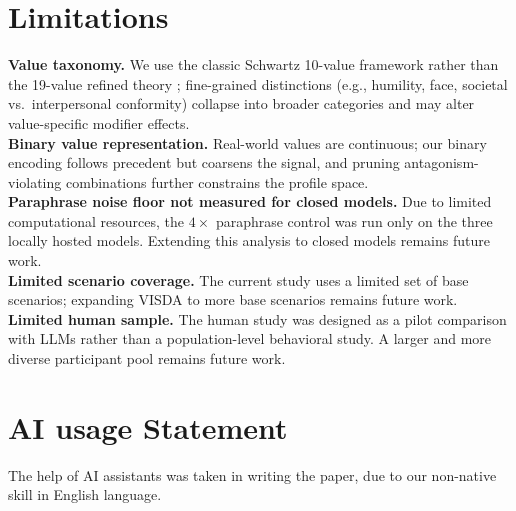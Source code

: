\documentclass[11pt]{article}
\begin{document}
\section*{Limitations}
\label{sec:limitations}
\textbf{Value taxonomy.} We use the classic Schwartz 10-value framework rather than the 19-value refined theory \citep{schwartz2012refined}; fine-grained distinctions (e.g., humility, face, societal vs.\ interpersonal conformity) collapse into broader categories and may alter value-specific modifier effects.\\[2pt]
\textbf{Binary value representation.} Real-world values are continuous; our binary encoding follows precedent \citep{sorensen2024value} but coarsens the signal, and pruning antagonism-violating combinations further constrains the profile space.\\[2pt]
\textbf{Paraphrase noise floor not measured for closed models.} Due to limited computational resources, the $4\times$ paraphrase control was run only on the three locally hosted models. Extending this analysis to closed models remains future work.\\[2pt]
\textbf{Limited scenario coverage.} The current study uses a limited set of base scenarios; expanding VISDA to more base scenarios remains future work.
\textbf{Limited human sample.} The human study was designed as a pilot comparison with LLMs rather than a population-level behavioral study. A larger and more diverse participant pool remains future work.

\section*{AI usage Statement}
The help of AI assistants was taken in writing the paper, due to our non-native skill in English language.
\end{document}
